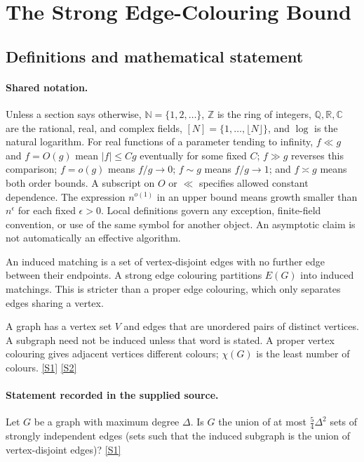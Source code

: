 \documentclass[11pt,a4paper]{article}
\newcommand{\N}{\mathbb{N}}
\newcommand{\Z}{\mathbb{Z}}
\newcommand{\Q}{\mathbb{Q}}
\newcommand{\R}{\mathbb{R}}
\newcommand{\C}{\mathbb{C}}
\newcommand{\sref}[2]{\hyperlink{source:#1:#2}{[S#2]}}
\begin{document}
\section{The Strong Edge-Colouring Bound}\label{statement}


\subsection{Definitions and mathematical statement}

\paragraph{Shared notation.}Unless a section says otherwise, $\N=\{1,2,\ldots\}$,
$\Z$ is the ring of integers, $\Q,\R,\C$ are the rational, real, and complex
fields, $[N]=\{1,\ldots,\lfloor N\rfloor\}$, and $\log$ is the natural
logarithm. For real functions of a parameter tending to infinity,
$f\ll g$ and $f=O(g)$ mean $|f|\leq Cg$ eventually for some fixed $C$;
$f\gg g$ reverses this comparison; $f=o(g)$ means $f/g\to0$;
$f\sim g$ means $f/g\to1$; and $f\asymp g$ means both order bounds.
A subscript on $O$ or $\ll$ specifies allowed constant dependence.
The expression $n^{o(1)}$ in an upper bound means growth smaller than
$n^\epsilon$ for each fixed $\epsilon>0$. Local definitions govern any
exception, finite-field convention, or use of the same symbol for another
object. An asymptotic claim is not automatically an effective algorithm.



An induced matching is a set of vertex-disjoint edges with no further edge between their endpoints. A strong edge colouring partitions $E(G)$ into induced matchings. This is stricter than a proper edge colouring, which only separates edges sharing a vertex.

A graph has a vertex set $V$ and edges that are unordered pairs of distinct vertices. A subgraph need not be induced unless that word is stated. A proper vertex colouring gives adjacent vertices different colours; $\chi(G)$ is the least number of colours. \sref{statement}{1} \sref{statement}{2}

\paragraph{Statement recorded in the supplied source.}
Let $G$ be a graph with maximum degree $\Delta$. Is $G$ the union of at most $\tfrac{5}{4}\Delta^2$ sets of strongly independent edges (sets such that the induced subgraph is the union of vertex-disjoint edges)? \sref{statement}{1}
\end{document}

